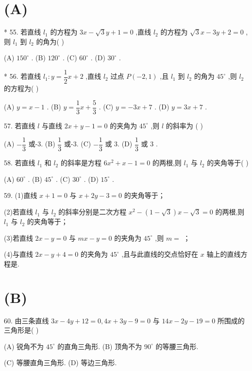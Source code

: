 \section*{(A)}

* 55. 若直线 ${l}_{1}$ 的方程为 ${3x} - \sqrt{3}y + 1 = 0$ ,直线 ${l}_{2}$ 的方程为 $\sqrt{3}x - {3y} + 2 = 0$ ,则 ${l}_{1}$ 到 ${l}_{2}$ 的角为(   )

(A) ${150}^{ \circ  }$ . (B) ${120}^{ \circ  }$ . (C) ${60}^{ \circ  }$ . (D) ${30}^{ \circ  }$ .

* 56. 若直线 ${l}_{1} : y = \dfrac{1}{2}x + 2$ ,直线 ${l}_{2}$ 过点 $P\left( {-2,1}\right)$ ,且 ${l}_{1}$ 到 ${l}_{2}$ 的角为 ${45}^{ \circ  }$ ,则 ${l}_{2}$ 的方程为(   )

(A) $y = x - 1$ . (B) $y = \dfrac{1}{3}x + \dfrac{5}{3}$ . (C) $y =  - {3x} + 7$ . (D) $y = {3x} + 7$ .

57. 若直线 $l$ 与直线 ${2x} + y - 1 = 0$ 的夹角为 ${45}^{ \circ  }$ ,则 $l$ 的斜率为 (   )

(A) $- \dfrac{1}{3}$ 或-3. (B) $\dfrac{1}{3}$ 或-3. (C) $- \dfrac{1}{3}$ 或 3. (D) $\dfrac{1}{3}$ 或 3 .

58. 若直线 ${l}_{1}$ 和 ${l}_{2}$ 的斜率是方程 $6{x}^{2} + x - 1 = 0$ 的两根,则 ${l}_{1}$ 与 ${l}_{2}$ 的夹角等于(   )

(A) ${60}^{ \circ  }$ . (B) ${45}^{ \circ  }$ . (C) ${30}^{ \circ  }$ . (D) ${15}^{ \circ  }$ .

59. (1)直线 $x + 1 = 0$ 与 $x + {2y} - 3 = 0$ 的夹角等于\blkda{}；

(2)若直线 ${l}_{1}$ 与 ${l}_{2}$ 的斜率分别是二次方程 ${x}^{2} - \left( {1 - \sqrt{3}}\right) x - \sqrt{3} = 0$ 的两根,则 ${l}_{1}$ 与 ${l}_{2}$ 的夹角等于\blkda{}；

(3)若直线 ${2x} - y = 0$ 与 ${mx} - y = 0$ 的夹角为 ${45}^{ \circ  }$ ,则 $m =$ \blkda{}；

(4)与直线 ${2x} - y + 4 = 0$ 的夹角为 ${45}^{ \circ  }$ ,且与此直线的交点恰好在 $x$ 轴上的直线方程是\blkda{}.

\section*{(B)}

60. 由三条直线 ${3x} - {4y} + {12} = 0,{4x} + {3y} - 9 = 0$ 与 ${14x} - {2y} - {19} = 0$ 所围成的三角形是(   )

(A) 锐角不为 ${45}^{ \circ  }$ 的直角三角形. (B) 顶角不为 ${90}^{ \circ  }$ 的等腰三角形.

(C) 等腰直角三角形. (D) 等边三角形.

